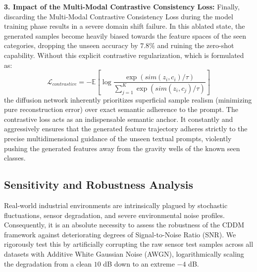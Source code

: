 \textbf{3. Impact of the Multi-Modal Contrastive Consistency Loss:}
Finally, discarding the Multi-Modal Contrastive Consistency Loss during the model training phase results in a severe domain shift failure. In this ablated state, the generated samples become heavily biased towards the feature spaces of the seen categories, dropping the unseen accuracy by $7.8\%$ and ruining the zero-shot capability. Without this explicit contrastive regularization, which is formulated as:
\begin{equation}
    \label{eq:contrastive_loss}
    \mathcal{L}_{contrastive} = - \mathbb{E} \left[ \log \frac{\exp(sim(z_i, c_i)/\tau)}{\sum_{j=1}^{K} \exp(sim(z_i, c_j)/\tau)} \right]
\end{equation}
the diffusion network inherently prioritizes superficial sample realism (minimizing pure reconstruction error) over exact semantic adherence to the prompt. The contrastive loss acts as an indispensable semantic anchor. It constantly and aggressively ensures that the generated feature trajectory adheres strictly to the precise multidimensional guidance of the unseen textual prompts, violently pushing the generated features away from the gravity wells of the known seen classes.

\subsection{Sensitivity and Robustness Analysis}
\label{subsec:sensitivity_analysis}

Real-world industrial environments are intrinsically plagued by stochastic fluctuations, sensor degradation, and severe environmental noise profiles. Consequently, it is an absolute necessity to assess the robustness of the CDDM framework against deteriorating degrees of Signal-to-Noise Ratio (SNR). We rigorously test this by artificially corrupting the raw sensor test samples across all datasets with Additive White Gaussian Noise (AWGN), logarithmically scaling the degradation from a clean $10$ dB down to an extreme $-4$ dB. 

